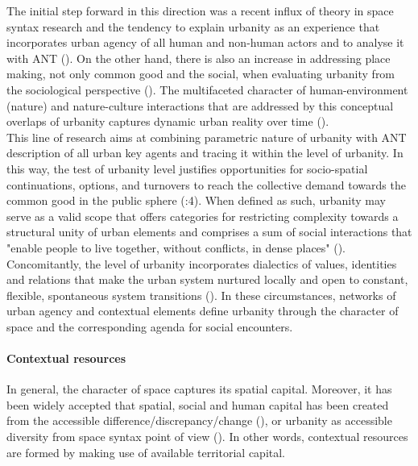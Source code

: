 \documentclass[11pt]{report}
\begin{document}
The initial step forward in this direction was a recent influx of theory in space syntax research and the tendency to explain urbanity as an experience that incorporates urban agency of all human and non-human actors and to analyse it with ANT (\cite{(Rheintantz 2012)}).
On the other hand, there is also an increase in addressing place making, not only common good and the social, when evaluating urbanity from the sociological perspective (\href{Holden}{\citealt{holden_justifying_2015}}). 
The multifaceted character of human-environment (nature) and nature-culture interactions that are addressed by this conceptual overlaps of urbanity captures dynamic urban reality over time (\href{Tardin}{\citealt{tardin_landscape_2014}}).
\\

This line of research aims at combining parametric nature of urbanity with ANT description of all urban key agents and tracing it within the level of urbanity. In this way, the test of urbanity level justifies opportunities for socio-spatial continuations, options, and turnovers to reach the collective demand towards the common good in the public sphere (\href{Holden}{\citealt{holden_justifying_2015}}:4). 
When defined as such, urbanity may serve as a valid scope that offers categories for restricting complexity towards a structural unity of urban elements and comprises a sum of social interactions that "enable people  to  live  together,  without  conflicts,  in  dense places"
(\cite{Bisson 2016; Monnet, 1999, in Dorrier-Apprill, 2001}).
Concomitantly, the level of urbanity incorporates dialectics of values, identities and relations that make the urban system nurtured locally and open to constant, flexible, spontaneous system transitions (\href{Groth}{\citealt{groth_reclaiming_2005}}).
In these circumstances, networks of urban agency and contextual elements define urbanity through the character of space and the corresponding agenda for social encounters.

\paragraph{Contextual resources}

In general, the character of space captures its spatial capital. 
Moreover, it has been widely accepted that spatial, social and human capital has been created from the accessible difference/discrepancy/change (\cite{(Becker 1964; Coleman 1988)})\href{Coleman}{\citealt{coleman_social_1988}}, or urbanity as accessible diversity from space syntax point of view (\href{Marcus}{\citealt{marcus_spatial_2007}}). In other words, contextual resources are formed by making use of available territorial capital.
\\
\end{document}
